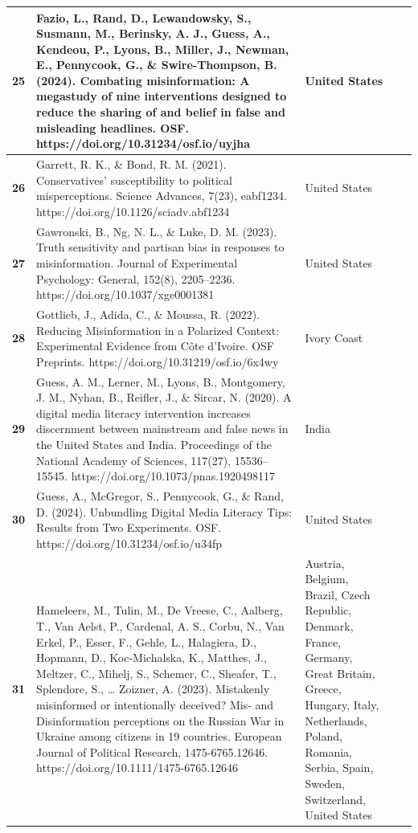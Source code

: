 \documentclass[
  man]{apa6}
\begin{document}
\begin{longtable}[t]{>{}r||>{\raggedright\arraybackslash}p{20em}|>{\raggedright\arraybackslash}p{7em}|>{\raggedleft\arraybackslash}p{5em}|>{\raggedleft\arraybackslash}p{5em}}
\hline
\textbf{25} & Fazio, L., Rand, D., Lewandowsky, S., Susmann, M., Berinsky, A. J., Guess, A., Kendeou, P., Lyons, B., Miller, J., Newman, E., Pennycook, G., \& Swire-Thompson, B. (2024). Combating misinformation: A megastudy of nine interventions designed to reduce the sharing of and belief in false and misleading headlines. OSF. https://doi.org/10.31234/osf.io/uyjha & United States & 2 & 1617\\
\hline
\textbf{26} & Garrett, R. K., \& Bond, R. M. (2021). Conservatives’ susceptibility to political misperceptions. Science Advances, 7(23), eabf1234. https://doi.org/10.1126/sciadv.abf1234 & United States & 47 & 1204\\
\hline
\textbf{27} & Gawronski, B., Ng, N. L., \& Luke, D. M. (2023). Truth sensitivity and partisan bias in responses to misinformation. Journal of Experimental Psychology: General, 152(8), 2205–2236. https://doi.org/10.1037/xge0001381 & United States & 4 & 481\\
\hline
\textbf{28} & Gottlieb, J., Adida, C., \& Moussa, R. (2022). Reducing Misinformation in a Polarized Context: Experimental Evidence from Côte d’Ivoire. OSF Preprints. https://doi.org/10.31219/osf.io/6x4wy & Ivory Coast & 2 & 1160\\
\hline
\textbf{29} & Guess, A. M., Lerner, M., Lyons, B., Montgomery, J. M., Nyhan, B., Reifler, J., \& Sircar, N. (2020). A digital media literacy intervention increases discernment between mainstream and false news in the United States and India. Proceedings of the National Academy of Sciences, 117(27), 15536–15545. https://doi.org/10.1073/pnas.1920498117 & India & 4 & 3508\\
\hline
\textbf{30} & Guess, A., McGregor, S., Pennycook, G., \& Rand, D. (2024). Unbundling Digital Media Literacy Tips: Results from Two Experiments. OSF. https://doi.org/10.31234/osf.io/u34fp & United States & 9 & 1088\\
\hline
\textbf{31} & Hameleers, M., Tulin, M., De Vreese, C., Aalberg, T., Van Aelst, P., Cardenal, A. S., Corbu, N., Van Erkel, P., Esser, F., Gehle, L., Halagiera, D., Hopmann, D., Koc‐Michalska, K., Matthes, J., Meltzer, C., Mihelj, S., Schemer, C., Sheafer, T., Splendore, S., … Zoizner, A. (2023). Mistakenly misinformed or intentionally deceived? Mis‐ and Disinformation perceptions on the Russian War in Ukraine among citizens in 19 countries. European Journal of Political Research, 1475-6765.12646. https://doi.org/10.1111/1475-6765.12646 & Austria, Belgium, Brazil, Czech Republic, Denmark, France, Germany, Great Britain, Greece, Hungary, Italy, Netherlands, Poland, Romania, Serbia, Spain, Sweden, Switzerland, United States & 19 & 19037\\

\end{longtable}
\end{document}

